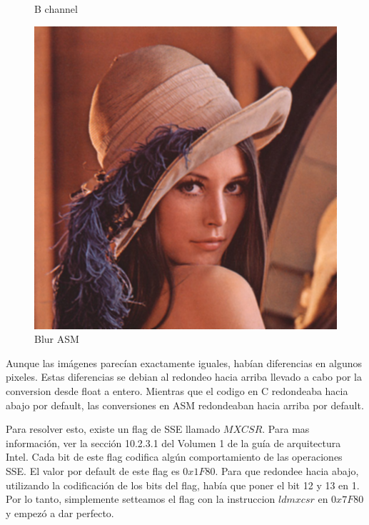 \begin{figure}[!htb]
  \caption{B channel}
\endminipage\hfill
{}%
  \includegraphics[width=\linewidth]{lenablurasm1.png}
  \caption{Blur ASM}
\endminipage
\end{figure}

Aunque las imágenes parecían exactamente iguales, habían diferencias en algunos pixeles. Estas diferencias se debian al redondeo hacia arriba llevado a cabo por la conversion desde float a entero. Mientras que el codigo en C redondeaba hacia abajo por default, las conversiones en ASM redondeaban hacia arriba por default.

Para resolver esto, existe un flag de SSE llamado $MXCSR$. Para mas información, ver la sección 10.2.3.1 del Volumen 1 de la guía de arquitectura Intel. Cada bit de este flag codifica algún comportamiento de las operaciones SSE. El valor por default de este flag es $0x1F80$. Para que redondee hacia abajo, utilizando la codificación de los bits del flag, había que poner el bit 12 y 13 en 1. Por lo tanto, simplemente setteamos el flag con la instruccion $ldmxcsr$ en $0x7F80$ y empezó a dar perfecto.

